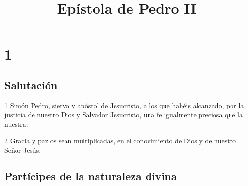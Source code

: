 
\title{Epístola de Pedro II}

\chapter{1}

\section*{Salutación}

\par 1 Simón Pedro, siervo y apóstol de Jesucristo, a los que habéis alcanzado, por la justicia de nuestro Dios y Salvador Jesucristo, una fe igualmente preciosa que la nuestra:
\par 2 Gracia y paz os sean multiplicadas, en el conocimiento de Dios y de nuestro Señor Jesús.

\section*{Partícipes de la naturaleza divina}

